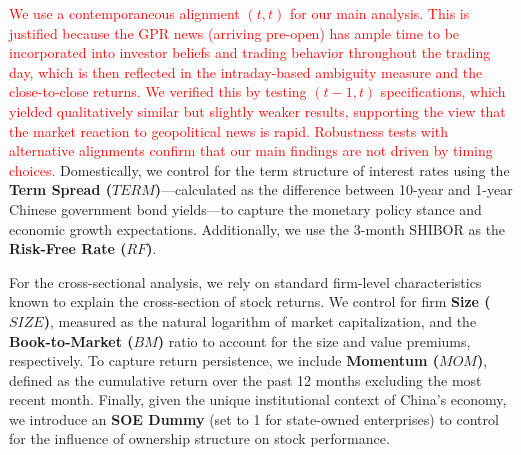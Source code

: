 \documentclass[preprint,12pt,authoryear]{elsarticle}
\begin{document}
\textcolor{red}{We use a contemporaneous alignment $(t, t)$ for our main analysis. This is justified because the GPR news (arriving pre-open) has ample time to be incorporated into investor beliefs and trading behavior throughout the trading day, which is then reflected in the intraday-based ambiguity measure and the close-to-close returns. We verified this by testing $(t-1, t)$ specifications, which yielded qualitatively similar but slightly weaker results, supporting the view that the market reaction to geopolitical news is rapid. Robustness tests with alternative alignments confirm that our main findings are not driven by timing choices.} Domestically, we control for the term structure of interest rates using the \textbf{Term Spread ($TERM$)}—calculated as the difference between 10-year and 1-year Chinese government bond yields—to capture the monetary policy stance and economic growth expectations. Additionally, we use the 3-month SHIBOR as the \textbf{Risk-Free Rate ($RF$)}.

For the cross-sectional analysis, we rely on standard firm-level characteristics known to explain the cross-section of stock returns. We control for firm \textbf{Size ($SIZE$)}, measured as the natural logarithm of market capitalization, and the \textbf{Book-to-Market ($BM$)} ratio to account for the size and value premiums, respectively. To capture return persistence, we include \textbf{Momentum ($MOM$)}, defined as the cumulative return over the past 12 months excluding the most recent month. Finally, given the unique institutional context of China's economy, we introduce an \textbf{SOE Dummy} (set to 1 for state-owned enterprises) to control for the influence of ownership structure on stock performance.
\end{document}
